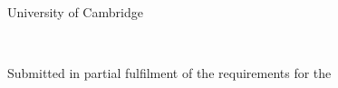 \begin{titlepage}
  \vspace*{2cm}
  \makeatletter
  \begin{center}
    \begin{Huge}
      \textbf{\textsc{\@title}}
    \end{Huge}\\[0.5cm]
    \begin{Large}
      \textsc{\@subtitle}
    \end{Large}\\[3cm]
    \begin{Huge}
      \@author        
    \end{Huge}\\[1.5cm]
    \\[0.3cm]
    \begin{Large}
      \college{}   
    \end{Large}\\[0.2cm]
    \begin{large}
      University of Cambridge
    \end{large}\\[3cm]
    \begin{Large}
        \submissionmonthyear{}
    \end{Large}
    \vfill
    Submitted in partial fulfilment of the requirements for the  \\
    \emph{\coursethe}
  \end{center}
  \makeatother
\end{titlepage}

\newpage
